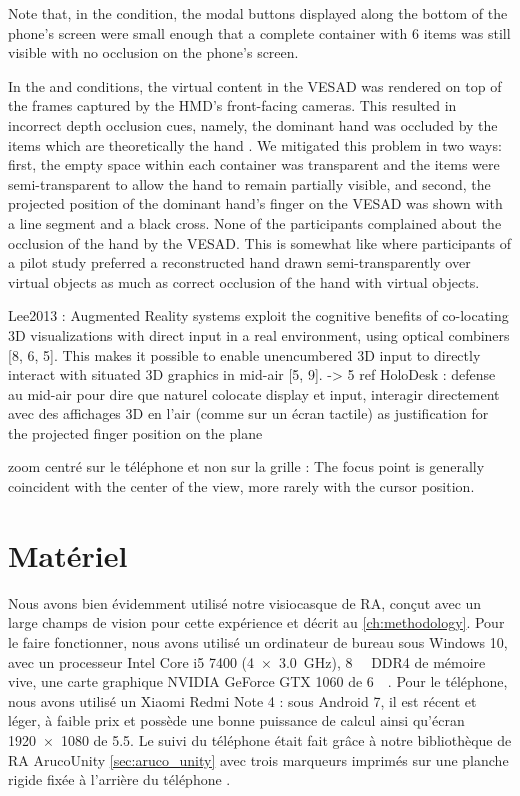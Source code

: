 Note that, in the  condition, the modal buttons displayed along the bottom of the phone's screen were small enough that a complete container with 6 items was still visible with no occlusion on the phone's screen.

In the  and  conditions, the virtual content in the VESAD was rendered on top of the frames captured by the HMD's front-facing cameras. This resulted in incorrect depth occlusion cues, namely, the dominant hand was occluded by the items which are theoretically  the hand . We mitigated this problem in two ways: first, the empty space within each container was transparent and the items were semi-transparent to allow the hand to remain partially visible, and second, the projected position of the dominant hand's finger on the VESAD was shown with a line segment and a black cross. None of the participants complained about the occlusion of the hand by the VESAD. This is somewhat like \cite[Figure 3c]{Piumsomboon2014} where participants of a pilot study preferred a reconstructed hand drawn semi-transparently over virtual objects as much as correct occlusion of the hand with virtual objects.

Lee2013 : Augmented Reality systems exploit the cognitive benefits of co-locating 3D visualizations with direct input in a real environment, using optical combiners [8, 6, 5]. This makes it possible to enable unencumbered 3D input to directly interact with situated 3D graphics in mid-air [5, 9]. -> 5 ref HoloDesk : defense au mid-air pour dire que naturel colocate display et input, interagir directement avec des affichages 3D en l'air (comme sur un écran tactile)\cite{Chan2010} as justification for the projected finger position on the plane

zoom centré sur le téléphone et non sur la grille : The focus point is generally coincident with the center of the view, more rarely with the cursor position. \cite{Guiard2004}


\section{Matériel}
\label{sec:experiment_material}

Nous avons bien évidemment utilisé notre visiocasque de RA, conçut avec un large champs de vision pour cette expérience et décrit au \autoref{ch:methodology}. Pour le faire fonctionner, nous avons utilisé un ordinateur de bureau sous Windows 10, avec un processeur Intel Core i5 7400 (\SI[product-units = single]{4x3.0}{\GHz}), \SI{8}{\giga\byte} DDR4 de mémoire vive, une carte graphique NVIDIA GeForce GTX 1060 de \SI{6}{\giga\byte}. Pour le téléphone, nous avons utilisé un Xiaomi Redmi Note 4 : sous Android 7, il est récent et léger, à faible prix et possède une bonne puissance de calcul ainsi qu'écran \SI{1920x1080}{\px} de \SI{5.5}{\inch}. Le suivi du téléphone était fait grâce à notre bibliothèque de RA ArucoUnity \autoref{sec:aruco_unity} avec trois marqueurs imprimés sur une planche rigide fixée à l'arrière du téléphone .

